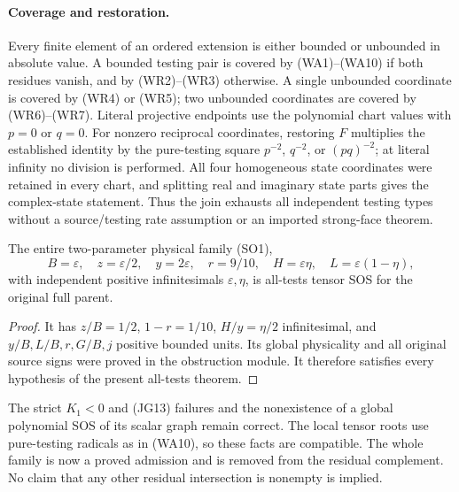 \paragraph{Coverage and restoration.}
Every finite element of an ordered extension is either bounded or
unbounded in absolute value. A bounded testing pair is covered by
(WA1)--(WA10) if both residues vanish, and by (WR2)--(WR3)
otherwise. A single unbounded coordinate is covered by (WR4) or
(WR5); two unbounded coordinates are covered by (WR6)--(WR7).
Literal projective endpoints use the polynomial chart values with
$p=0$ or $q=0$. For nonzero reciprocal coordinates, restoring
$F$ multiplies the established identity by the pure-testing
square $p^{-2}$, $q^{-2}$, or $(pq)^{-2}$; at literal infinity
no division is performed. All four homogeneous state coordinates
were retained in every chart, and splitting real and imaginary
state parts gives the complex-state statement. Thus the join
exhausts all independent testing types without a source/testing
rate assumption or an imported strong-face theorem.

\begin{corollary}
The entire two-parameter physical family (SO1),
\[
 B=\varepsilon,\quad z=\varepsilon/2,\quad y=2\varepsilon,
 \quad r=9/10,\quad H=\varepsilon\eta,
 \quad L=\varepsilon(1-\eta),
\]
with independent positive infinitesimals $\varepsilon,\eta$, is
all-tests tensor SOS for the original full parent.
\end{corollary}
\begin{proof}
It has $z/B=1/2$, $1-r=1/10$, $H/y=\eta/2$ infinitesimal,
and $y/B,L/B,r,G/B,j$ positive bounded units. Its global
physicality and all original source signs were proved in the
obstruction module. It therefore satisfies every hypothesis of
the present all-tests theorem.
\end{proof}
The strict $K_1<0$ and (JG13) failures and the nonexistence of a
global polynomial SOS of its scalar graph remain correct.
The local tensor roots use pure-testing radicals as in (WA10),
so these facts are compatible. The whole family is now a proved
admission and is removed from the residual complement. No claim
that any other residual intersection is nonempty is implied.
